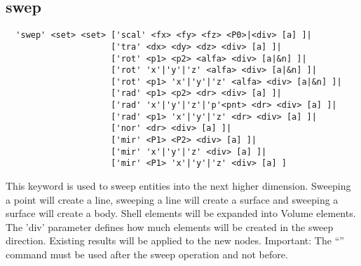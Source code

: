 \documentclass{article}
\begin{document}
\subsection{\label{swep}swep}
\begin{verbatim}
  'swep' <set> <set> ['scal' <fx> <fy> <fz> <P0>|<div> [a] ]|
                     ['tra' <dx> <dy> <dz> <div> [a] ]|
                     ['rot' <p1> <p2> <alfa> <div> [a|&n] ]|
                     ['rot' 'x'|'y'|'z' <alfa> <div> [a|&n] ]|
                     ['rot' <p1> 'x'|'y'|'z' <alfa> <div> [a|&n] ]|
                     ['rad' <p1> <p2> <dr> <div> [a] ]|
                     ['rad' 'x'|'y'|'z'|'p'<pnt> <dr> <div> [a] ]|
                     ['rad' <p1> 'x'|'y'|'z' <dr> <div> [a] ]|
                     ['nor' <dr> <div> [a] ]|
                     ['mir' <P1> <P2> <div> [a] ]|
                     ['mir' 'x'|'y'|'z' <div> [a] ]|
                     ['mir' <P1> 'x'|'y'|'z' <div> [a] ] 
\end{verbatim}
This keyword is used to sweep entities into the next higher dimension. Sweeping a point will create a line, sweeping a line will create a surface and sweeping a surface will create a body. Shell elements will be expanded into Volume elements. The 'div' parameter defines how much elements will be created in the sweep direction. Existing results will be applied to the new nodes. Important: The ``'' command must be used after the sweep operation and not before.
\end{document}
